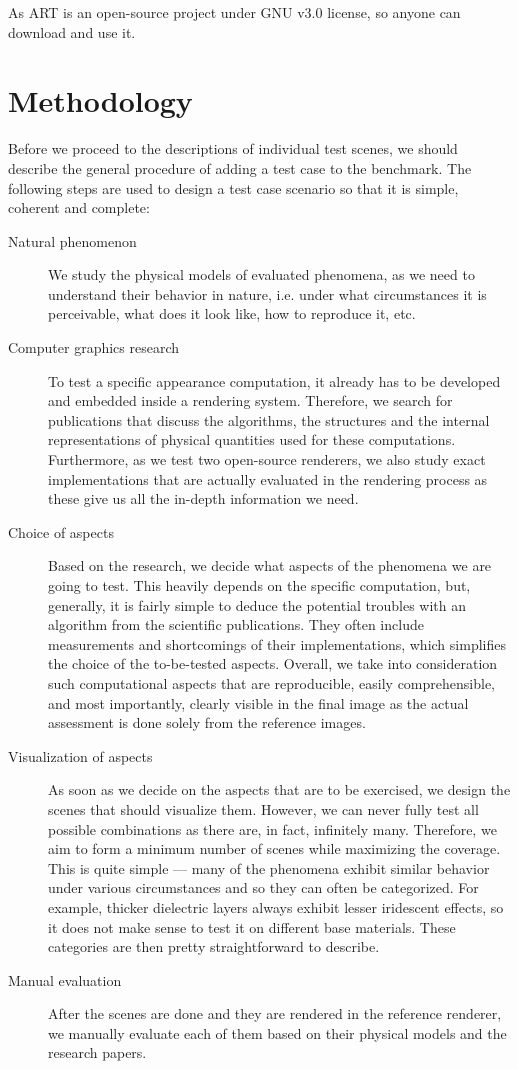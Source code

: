 As ART is an open-source project under GNU v3.0 license, so anyone can download and use it.

\section{Methodology}

Before we proceed to the descriptions of individual test scenes, we should describe the general procedure of adding a test case to the benchmark. The following steps are used to design a test case scenario so that it is simple, coherent and complete:

\begin{description}
	\item[Natural phenomenon] We study the physical models of evaluated phenomena, as we need to understand their behavior in nature, i.e. under what circumstances it is perceivable, what does it look like, how to reproduce it, etc.
	\item[Computer graphics research] To test a specific appearance computation, it already has to be developed and embedded inside a rendering system. Therefore, we search for publications that discuss the algorithms, the structures and the internal representations of physical quantities used for these computations. Furthermore, as we test two open-source renderers, we also study exact implementations that are actually evaluated in the rendering process as these give us all the in-depth information we need.
	\item[Choice of aspects] Based on the research, we decide what aspects of the phenomena we are going to test. This heavily depends on the specific computation, but, generally, it is fairly simple to deduce the potential troubles with an algorithm from the scientific publications. They often include measurements and shortcomings of their implementations, which simplifies the choice of the to-be-tested aspects. Overall, we take into consideration such computational aspects that are reproducible, easily comprehensible, and most importantly, clearly visible in the final image as the actual assessment is done solely from the reference images. 
	\item[Visualization of aspects] As soon as we decide on the aspects that are to be exercised, we design the scenes that should visualize them. However, we can never fully test all possible combinations as there are, in fact, infinitely many. Therefore, we aim to form a minimum number of scenes while maximizing the coverage. This is quite simple --- many of the phenomena exhibit similar behavior under various circumstances and so they can often be categorized. For example, thicker dielectric layers always exhibit lesser iridescent effects, so it does not make sense to test it on different base materials. These categories are then pretty straightforward to describe.
	\item[Manual evaluation] After the scenes are done and they are rendered in the reference renderer, we manually evaluate each of them based on their physical models and the research papers.
\end{description}

